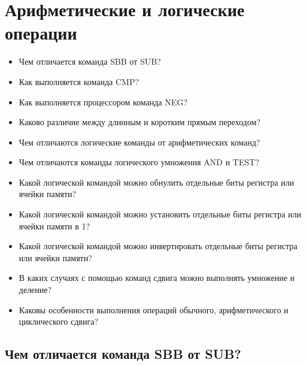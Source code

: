\chapter{Арифметические и логические операции}
\begin{itemize}
\item Чем отличается команда SBB от SUB?
\item Как выполняется команда CMP?
\item Как выполняется процессором команда NEG?
\item Каково различие между длинным и коротким прямым переходом?
\item Чем отличаются логические команды от арифметических команд?
\item Чем отличаются команды логического умножения AND и TEST?
\item Какой логической командой можно обнулить отдельные биты регистра или ячейки памяти?
\item Какой логической командой можно установить отдельные биты регистра или ячейки памяти в 1?
\item Какой логической командой можно инвертировать отдельные биты регистра или ячейки памяти?
\item В каких случаях с помощью команд сдвига можно выполнять умножение и деление?
\item Каковы особенности выполнения операций обычного, арифметического и циклического сдвига?
\end{itemize}

\section{Чем отличается команда SBB от SUB?}

